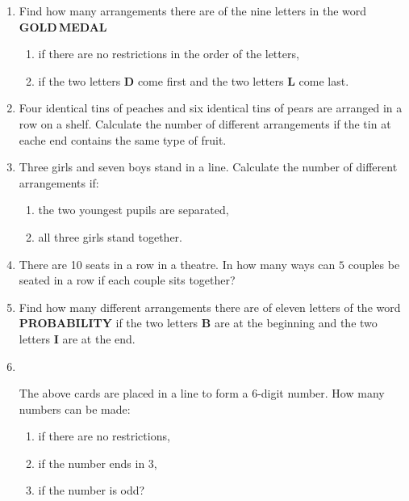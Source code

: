 \begin{enumerate}
\item Find how many arrangements there are of the nine letters in the word \textbf{GOLD\,MEDAL}

\begin{enumerate}
	\item if there are no restrictions in the order of the letters,
	\item if the two letters \textbf{D} come first and the two letters \textbf{L} come last.
\end{enumerate}


\item Four identical tins of peaches and six identical tins of pears are arranged in a row on a shelf. Calculate the number of different arrangements if the tin at eache end contains the same type of fruit.

\item Three girls and seven boys stand in a line. Calculate the number of different arrangements if:
\begin{enumerate}
	\item the two youngest pupils are separated,
	\item all three girls stand together.
\end{enumerate}

\item There are 10 seats in a row in a theatre. In how many ways can $5$ couples be seated in a row if each couple sits together?

\item Find how many different arrangements there are of eleven letters of the word \textbf{PROBABILITY} if the two letters \textbf{B} are at the beginning and the two letters \textbf{I} are at the end.

\item {} \,  \,  \,  \,  \, 

The above cards are placed in a line to form a $6$-digit number. How many numbers can be made:
\begin{enumerate}
	\item if there are no restrictions,
	\item if the number ends in $3$,
	\item if the number is odd?
\end{enumerate}

\end{enumerate}
\newpage
